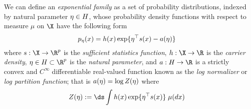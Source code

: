 \begin{definition}
We can define an \textit{exponential family} as a set of probability distributions, indexed by natural parameter $\eta \in H$,%
 whose probability density functions with respect to measure $\mu$ on $\X$ have the following form
\begin{align}
 p_\eta(x) = h(x) \exp \{ \eta^\top s(x) - a(\eta)\} 
\label{eqn:exponential_family_natural}
 \end{align}
where $\sufficientStatsFunction  : \X \to \R^p$ is the \textit{sufficient statistics function}, $\carrierDensity : \X \to \R$ is the \textit{carrier density}, $\naturalParam \in \naturalParamSpace \subset \R^p$ is the \textit{natural parameter},  and $\logNormalizerFunction : \naturalParamSpace \to \R$ is a strictly convex and $C^{\infty}$ differentiable real-valued function known as the \textit{log normalizer} or \textit{log partition function};  that is $a(\eta) = \log Z(\eta)$ where 
\begin{equation}
\label{eqn:partition_function}
 \normalizerFunction(\naturalParam) := \ds\int  \carrierDensity(x) \exp \{ \naturalParam^\top \sufficientStatsFunction(x)  \} \; \mu(dx)	
\end{equation}



\end{definition}
